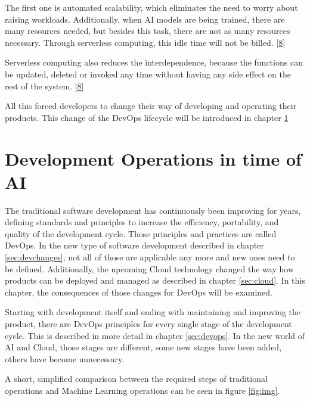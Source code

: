 \documentclass[12pt,english,a4paper,oneside,,tablecaptionabove]{scrbook}
\begin{document}
The first one is automated scalability, which eliminates the need to
worry about raising workloads. Additionally, when AI models are being
trained, there are many resources needed, but besides this task, there
are not as many resources necessary. Through serverless computing, this
idle time will not be billed.
{[}\protect\hyperlink{ref-BhagyashreeR}{8}{]}

Serverless computing also reduces the interdependence, because the
functions can be updated, deleted or invoked any time without having any
side effect on the rest of the system.
{[}\protect\hyperlink{ref-BhagyashreeR}{8}{]}

All this forced developers to change their way of developing and
operating their products. This change of the DevOps lifecycle will be
introduced in chapter \ref{sec:devopsai}

\hypertarget{sec:devopsai}{%
\section{Development Operations in time of AI}\label{sec:devopsai}}

The traditional software development has continuously been improving for
years, defining standards and principles to increase the efficiency,
portability, and quality of the development cycle. Those principles and
practices are called DevOps. In the new type of software development
described in chapter \ref{sec:devchanges}, not all of those are
applicable any more and new ones need to be defined. Additionally, the
upcoming Cloud technology changed the way how products can be deployed
and managed as described in chapter \ref{sec:cloud}. In this chapter,
the consequences of those changes for DevOps will be examined.

Starting with development itself and ending with maintaining and
improving the product, there are DevOps principles for every single
stage of the development cycle. This is described in more detail in
chapter \ref{sec:devops}. In the new world of AI and Cloud, those stages
are different, some new stages have been added, others have become
unnecessary.

A short, simplified comparison between the required steps of traditional
operations and Machine Learning operations can be seen in figure
\ref{fig:img}.
\end{document}
